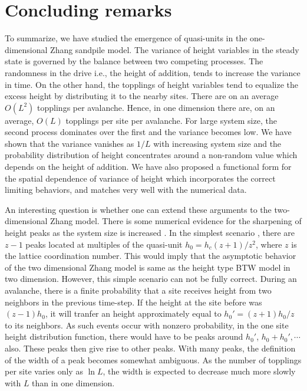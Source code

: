 \documentclass[11pt,a4paper]{book}
\begin{document}
\section{Concluding remarks}\label{ch4.6}
To summarize, we have studied the emergence of quasi-units in the
one-dimensional Zhang sandpile model. The variance of height variables 
in the steady state is governed by the balance between two competing 
processes. The randomness in the drive i.e., the height of addition, 
tends to increase the variance in time. On the other hand, the topplings 
of height variables tend to equalize the excess height by distributing 
it to the nearby sites. There are on an average $O(L^2)$ topplings per 
avalanche. Hence, in one dimension there are, on an average, $O(L)$ 
topplings per site per avalanche. For large system size, the second 
process dominates over the first and the variance becomes low. We have 
shown that the variance vanishes as $1/L$ with increasing system size 
and the probability distribution of height concentrates around a 
non-random value which depends on the height of addition. We have also 
proposed a functional form for the spatial dependence of variance of 
height which incorporates the correct limiting behaviors, and matches 
very well with the numerical data.

An interesting question is whether one can extend these arguments to the 
two-dimensional Zhang model. There is some numerical evidence for the sharpening of height
peaks as the system size is increased \cite{lubeck}. In the simplest scenario
\cite{lubeck}, there are $z-1$ peaks located at multiples 
of the quasi-unit $h_0=h_c(z+1)/z^2$, where 
$z$ is the lattice coordination number. This would imply
that the asymptotic behavior of the two dimensional Zhang model is same as the height type BTW model
in two dimension.
However, this simple scenario can not be fully correct. During an avalanche, there is a
finite probability that a site  receives height from two neighbors in the previous time-step. If the height at the site before
was $(z-1)h_0$, it will tranfer an height approximately equal to $h_0' = (z+1) h_0/z$ to its neighbors. As such events occur with nonzero probability,
in the one site height distribution function, there would have to be  peaks around $h_0'$, $h_0 + h_0',\cdots$ also.
These peaks then give rise to other peaks. With many peaks,
the definition of the width of a peak becomes somewhat ambiguous.
As the number of topplings per site varies only as $\ln L$,
the width is expected to decrease much more slowly with $L$ than in one dimension.
\end{document}
